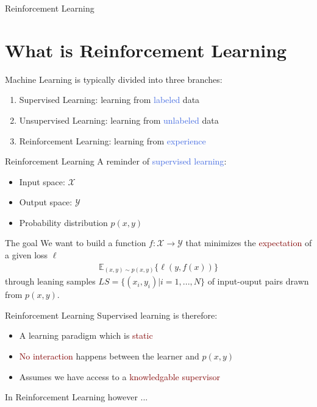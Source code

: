 \documentclass{beamer}
\begin{document}
\begin{frame}{Reinforcement Learning}
	\section{What is Reinforcement Learning}
	
	Machine Learning is typically divided into three branches:

	\begin{enumerate}
		\item Supervised Learning: learning from \textcolor{RoyalBlue}{labeled} data
		\item Unsupervised Learning: learning from \textcolor{RoyalBlue}{unlabeled} data
		\item Reinforcement Learning: learning from \textcolor{RoyalBlue}{experience}
	\end{enumerate}

\end{frame}


\begin{frame}{Reinforcement Learning}
	A reminder of \textcolor{RoyalBlue}{supervised learning}:
	\begin{itemize}
		\item Input space: $\mathcal{X}$
		\item Output space: $\mathcal{Y}$
		\item Probability distribution $p(x,y)$
	\end{itemize}

	\begin{block}{The goal}
		We want to build a function $f:\mathcal{X}\rightarrow\mathcal{Y}$ that minimizes the \textcolor{Maroon}{expectation} of a given loss $\ell$
		\begin{align*}
			\mathds{E}_{(x,y)\sim p(x,y)}\{\ell(y,f(x)) \}
		\end{align*}
		through leaning samples $LS=\{(x_i,y_i)|i=1,...,N\}$ of input-ouput pairs drawn from $p(x,y)$.
	\end{block}

\end{frame}

\begin{frame}{Reinforcement Learning}
	Supervised learning is therefore:
	\begin{itemize}
		\item A learning paradigm which is \textcolor{Maroon}{static}
		\item \textcolor{Maroon}{No interaction} happens between the learner and $p(x,y)$
		\item Assumes we have access to a \textcolor{Maroon}{knowledgable supervisor}
	\end{itemize}

	\bigskip
	In Reinforcement Learning however ...

\end{frame}
\end{document}
